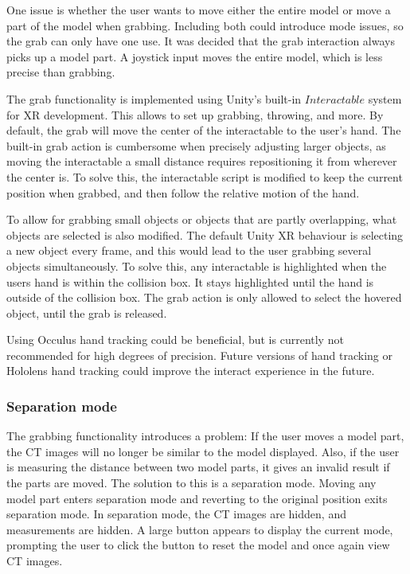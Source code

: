 \documentclass[a4paper]{report}
\begin{document}
One issue is whether the user wants to move either the entire model or move a part of the model when grabbing. Including both could introduce mode issues\cite{experience_modes_nodate}, so the grab can only have one use.
It was decided that the grab interaction always picks up a model part. A joystick input moves the entire model, which is less precise than grabbing.

The grab functionality is implemented using Unity's built-in $Interactable$ system for XR\cite{noauthor_xr_nodate} development. This allows to set up grabbing, throwing, and more. 
By default, the grab will move the center of the interactable to the user's hand. The built-in grab action is cumbersome when precisely adjusting larger objects, as moving the interactable a small distance requires repositioning it from wherever the center is. 
To solve this, the interactable script is modified to keep the current position when grabbed, and then follow the relative motion of the hand.

To allow for grabbing small objects or objects that are partly overlapping, what objects are selected is also modified. The default Unity XR behaviour is selecting a new object every frame, and this would lead to the user grabbing several objects simultaneously. To solve this, any interactable is highlighted when the users hand is within the collision box. It stays highlighted until the hand is outside of the collision box. The grab action is only allowed to select the hovered object, until the grab is released.

Using Occulus hand tracking\cite{noauthor_set_nodate} could be beneficial, but is currently not recommended for high degrees of precision. Future versions of hand tracking or Hololens hand tracking could improve the interact experience in the future.


\subsubsection{Separation mode}
The grabbing functionality introduces a problem: If the user moves a model part, the CT images will no longer be similar to the model displayed. Also, if the user is measuring the distance between two model parts, it gives an invalid result if the parts are moved. 
The solution to this is a separation mode. Moving any model part enters separation mode and reverting to the original position exits separation mode. In separation mode, the CT images are hidden, and measurements are hidden. A large button appears to display the current mode, prompting the user to click the button to reset the model and once again view CT images.
\end{document}
